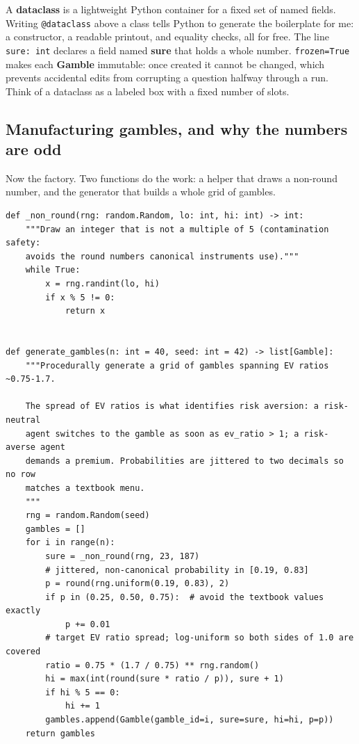 \documentclass[11pt]{article}
\newcommand{\term}[1]{\textbf{\color{mossdk}#1}}
\newcommand{\file}[1]{\textbf{\ttfamily #1}}
\begin{document}
\begin{defbox}[Dataclass]
A \term{dataclass} is a lightweight Python container for a fixed set of named fields. Writing
\verb|@dataclass| above a class tells Python to generate the boilerplate for me: a constructor, a
readable printout, and equality checks, all for free. The line \verb|sure: int| declares a field
named \file{sure} that holds a whole number. \verb|frozen=True| makes each \file{Gamble} immutable:
once created it cannot be changed, which prevents accidental edits from corrupting a question halfway
through a run. Think of a dataclass as a labeled box with a fixed number of slots.
\end{defbox}

\subsection{Manufacturing gambles, and why the numbers are odd}

Now the factory. Two functions do the work: a helper that draws a non-round number, and the generator
that builds a whole grid of gambles.

\begin{lstlisting}[style=py,firstnumber=41]
def _non_round(rng: random.Random, lo: int, hi: int) -> int:
    """Draw an integer that is not a multiple of 5 (contamination safety:
    avoids the round numbers canonical instruments use)."""
    while True:
        x = rng.randint(lo, hi)
        if x % 5 != 0:
            return x


def generate_gambles(n: int = 40, seed: int = 42) -> list[Gamble]:
    """Procedurally generate a grid of gambles spanning EV ratios ~0.75-1.7.

    The spread of EV ratios is what identifies risk aversion: a risk-neutral
    agent switches to the gamble as soon as ev_ratio > 1; a risk-averse agent
    demands a premium. Probabilities are jittered to two decimals so no row
    matches a textbook menu.
    """
    rng = random.Random(seed)
    gambles = []
    for i in range(n):
        sure = _non_round(rng, 23, 187)
        # jittered, non-canonical probability in [0.19, 0.83]
        p = round(rng.uniform(0.19, 0.83), 2)
        if p in (0.25, 0.50, 0.75):  # avoid the textbook values exactly
            p += 0.01
        # target EV ratio spread; log-uniform so both sides of 1.0 are covered
        ratio = 0.75 * (1.7 / 0.75) ** rng.random()
        hi = max(int(round(sure * ratio / p)), sure + 1)
        if hi % 5 == 0:
            hi += 1
        gambles.append(Gamble(gamble_id=i, sure=sure, hi=hi, p=p))
    return gambles
\end{lstlisting}
\end{document}
